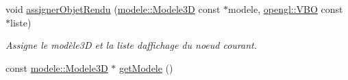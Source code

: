 \begin{DoxyCompactItemize}
void \hyperlink{group__inf2990_ga1f533acce98fbad7fa82758ccaea55ff}{assigner\+Objet\+Rendu} (\hyperlink{classmodele_1_1_modele3_d}{modele\+::\+Modele3\+D} const $\ast$modele, \hyperlink{classopengl_1_1_v_b_o}{opengl\+::\+V\+B\+O} const $\ast$liste)
\begin{DoxyCompactList}\small\item\em Assigne le modèle3\+D et la liste d\textquotesingle{}affichage du noeud courant. \end{DoxyCompactList}\item 
\hypertarget{group__inf2990_gacf20d310cd93a8ba2c3e4bc182398853}{}const \hyperlink{classmodele_1_1_modele3_d}{modele\+::\+Modele3\+D} $\ast$ \hyperlink{group__inf2990_gacf20d310cd93a8ba2c3e4bc182398853}{get\+Modele} ()\label{group__inf2990_gacf20d310cd93a8ba2c3e4bc182398853}


\end{DoxyCompactItemize}

